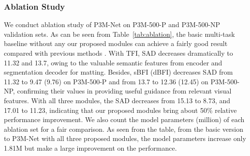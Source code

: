 \documentclass[twocolumn]{svjour3}
\begin{document}
\subsubsection{Ablation Study}
We conduct ablation study of P3M-Net on P3M-500-P and P3M-500-NP validation sets. As can be seen from Table~\ref{tab:ablation}, the basic multi-task baseline without any our proposed modules can achieve a fairly good result compared with previous methods \citep{shm,hatt,lf}. With TFI, SAD decreases dramatically to 11.32 and 13.7, owing to the valuable semantic features from encoder and segmentation decoder for matting. Besides, sBFI (dBFI) decreases SAD from 11.32 to 9.47 (9.76) on P3M-500-P and from 13.7 to 12.36 (12.45) on P3M-500-NP, confirming their values in providing useful guidance from relevant visual features. With all three modules, the SAD decreases from 15.13 to 8.73, and 17.01 to 11.23, indicating that our proposed modules bring about 50\% relative performance improvement. We also count the model parameters (million) of each ablation set for a fair comparison. As seen from the table, from the basic version to P3M-Net with all three proposed modules, the model parameters increase only 1.81M but make a large improvement on the performance.


\begin{table*}[htb]
\begin{center}
\end{center}
\caption{Ablation study of the key modules in P3M-Net. The BASIC version stands for the bare multi-task framework without any addition modules.}
\label{tab:ablation}
\end{table*}
\end{document}
